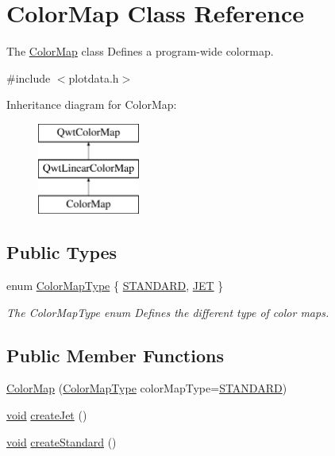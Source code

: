 \hypertarget{class_color_map}{\section{Color\-Map Class Reference}
\label{class_color_map}
}


The \hyperlink{class_color_map}{Color\-Map} class Defines a program-\/wide colormap.  




{\ttfamily \#include $<$plotdata.\-h$>$}

Inheritance diagram for Color\-Map\-:\begin{figure}[H]
\begin{center}
\leavevmode
\includegraphics[height=3.000000cm]{class_color_map}
\end{center}
\end{figure}
\subsection*{Public Types}
\begin{DoxyCompactItemize}
\item 
enum \hyperlink{group___scope_plugin_ga7f4f087196557757ec8061242e795031}{Color\-Map\-Type} \{ \hyperlink{group___scope_plugin_gga7f4f087196557757ec8061242e795031ada2d98ce081f031c9195188175d92d44}{S\-T\-A\-N\-D\-A\-R\-D}, 
\hyperlink{group___scope_plugin_gga7f4f087196557757ec8061242e795031a022cb7b62aaf4ea9c2c48375d4b187d8}{J\-E\-T}
 \}
\begin{DoxyCompactList}\small\item\em The Color\-Map\-Type enum Defines the different type of color maps. \end{DoxyCompactList}\end{DoxyCompactItemize}
\subsection*{Public Member Functions}
\begin{DoxyCompactItemize}
\item 
\hyperlink{group___scope_plugin_ga161e07946c9ab58fd04048a781700ff6}{Color\-Map} (\hyperlink{group___scope_plugin_ga7f4f087196557757ec8061242e795031}{Color\-Map\-Type} color\-Map\-Type=\hyperlink{group___scope_plugin_gga7f4f087196557757ec8061242e795031ada2d98ce081f031c9195188175d92d44}{S\-T\-A\-N\-D\-A\-R\-D})
\item 
\hyperlink{group___u_a_v_objects_plugin_ga444cf2ff3f0ecbe028adce838d373f5c}{void} \hyperlink{group___scope_plugin_ga040b747e27af88d72ffee08958e26e1c}{create\-Jet} ()
\item 
\hyperlink{group___u_a_v_objects_plugin_ga444cf2ff3f0ecbe028adce838d373f5c}{void} \hyperlink{group___scope_plugin_ga1900e4d813aed6169f83d1d83c3746e3}{create\-Standard} ()
\end{DoxyCompactItemize}


